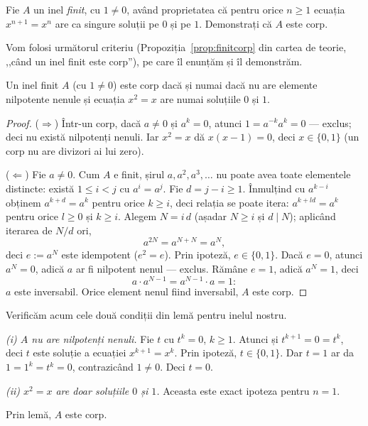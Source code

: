 \begin{problema}
Fie $A$ un inel \emph{finit}, cu $1\neq 0$, având proprietatea că
pentru orice $n\ge 1$ ecuația $x^{n+1}=x^{n}$ are ca singure soluții
pe $0$ și pe $1$. Demonstrați că $A$ este corp.
\end{problema}

\begin{solutie}
Vom folosi următorul criteriu (Propoziția~\ref{prop:finitcorp} din cartea de teorie,
,,când un inel finit este corp''), pe care îl enunțăm
și îl demonstrăm.

\begin{lemat}
Un inel finit $A$ (cu $1\neq 0$) este corp dacă și numai dacă nu
are elemente nilpotente nenule și ecuația $x^{2}=x$ are numai
soluțiile $0$ și $1$.
\end{lemat}

\begin{proof}
($\Rightarrow$) Într-un corp, dacă $a\neq 0$ și $a^{k}=0$, atunci
$1=a^{-k}a^{k}=0$ --- exclus; deci nu există nilpotenți nenuli. Iar
$x^{2}=x$ dă $x(x-1)=0$, deci $x\in\{0,1\}$ (un corp nu are divizori ai
lui zero).

($\Leftarrow$) Fie $a\neq 0$. Cum $A$ e finit, șirul $a,a^{2},a^{3},\dots$
nu poate avea toate elementele distincte: există $1\le i<j$ cu
$a^{i}=a^{j}$. Fie $d=j-i\ge 1$. Înmulțind cu $a^{k-i}$ obținem
$a^{k+d}=a^{k}$ pentru orice $k\ge i$, deci relația se poate itera:
$a^{k+ld}=a^{k}$ pentru orice $l\ge 0$ și $k\ge i$. Alegem $N=i\,d$
(așadar $N\ge i$ și $d\mid N$); aplicând iterarea de $N/d$ ori,
\[
  a^{2N}=a^{N+N}=a^{N},
\]
deci $e:=a^{N}$ este idempotent ($e^{2}=e$). Prin ipoteză,
$e\in\{0,1\}$. Dacă $e=0$, atunci $a^{N}=0$, adică $a$ ar fi nilpotent
nenul --- exclus. Rămâne $e=1$, adică $a^{N}=1$, deci
\[
  a\cdot a^{N-1}=a^{N-1}\cdot a=1 :
\]
$a$ este inversabil. Orice element nenul fiind inversabil, $A$ este corp.
\end{proof}

Verificăm acum cele două condiții din lemă pentru inelul
nostru.

\smallskip
\textit{(i) $A$ nu are nilpotenți nenuli.} Fie $t$ cu $t^{k}=0$,
$k\ge 1$. Atunci și $t^{k+1}=0=t^{k}$, deci $t$ este soluție a
ecuației $x^{k+1}=x^{k}$. Prin ipoteză, $t\in\{0,1\}$. Dar $t=1$ ar da
$1=1^{k}=t^{k}=0$, contrazicând $1\neq 0$. Deci $t=0$.

\smallskip
\textit{(ii) $x^{2}=x$ are doar soluțiile $0$ și $1$.} Aceasta este
exact ipoteza pentru $n=1$.

\smallskip
Prin lemă, $A$ este corp.
\end{solutie}

